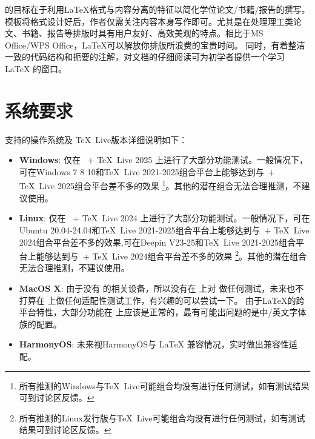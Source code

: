 \projectname 的目标在于利用\LaTeX{}格式与内容分离的特征以简化学位论文/书籍/报告的撰写。模板将格式设计好后，作者仅需关注内容本身写作即可。尤其是在处理理工类论文、书籍、报告等排版时具有用户友好、高效美观的特点。相比于MS Office/WPS Office，\LaTeX{}可以解放你排版所浪费的宝贵时间。 同时，\projectname 有着整洁一致的代码结构和扼要的注解，对文档的仔细阅读可为初学者提供一个学习 \LaTeX{} 的窗口。

\section{系统要求}\label{sec:system}

支持的操作系统及 \TeX~Live版本详细说明如下：
\begin{itemize}
\item \textbf{Windows}:  \project 仅在 \projectwindows~+ \TeX~Live 2025 上进行了大部分功能测试。一般情况下，可在Windows 7 8 10和\TeX~Live 2021-2025组合平台上能够达到与\projectwindows~+ \TeX~Live 2025组合平台差不多的效果 \footnote{所有推测的Windows与\TeX~Live可能组合均没有进行任何测试，如有测试结果可到讨论区反馈。}。其他的潜在组合无法合理推测，不建议使用。

\item \textbf{Linux}:  \project 仅在  \projectlinux~+ \TeX~Live 2024 上进行了大部分功能测试。一般情况下，可在Ubuntu 20.04-24.04和\TeX~Live 2021-2025组合平台上能够达到与\projectlinux~+ \TeX~Live 2024组合平台差不多的效果,可在Deepin V23-25和\TeX~Live 2021-2025组合平台上能够达到与\projectlinux~+ \TeX~Live 2024组合平台差不多的效果 \footnote{所有推测的Linux发行版与\TeX~Live可能组合均没有进行任何测试，如有测试结果可到讨论区反馈。}。其他的潜在组合无法合理推测，不建议使用。

\item \textbf{MacOS X}:  由于没有 \projectmacos 的相关设备，所以没有在 \projectmacos 上对 \project 做任何测试，未来也不打算在 \projectmacos 上做任何适配性测试工作，有兴趣的可以尝试一下。 由于\LaTeX{}的跨平台特性，大部分功能在 \projectmacos 上应该是正常的，最有可能出问题的是中/英文字体族的配置。

\item \textbf{HarmonyOS}:  未来视HarmonyOS与 \LaTeX{} 兼容情况，实时做出兼容性适配。
\end{itemize}

